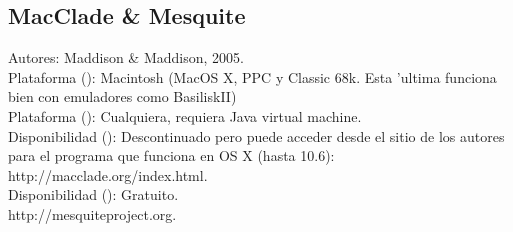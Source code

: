 \subsection{MacClade \& Mesquite}
\noindent
Autores: Maddison \& Maddison, 2005.\\
Plataforma (): Macintosh (MacOS X, PPC y Classic 68k. Esta 'ultima funciona bien con emuladores como BasiliskII)\\
Plataforma (): Cualquiera, requiera Java virtual machine.\\
Disponibilidad (): Descontinuado pero puede acceder desde el sitio de los autores para el programa que funciona en OS X (hasta 10.6):\\
http://macclade.org/index.html.
\\
Disponibilidad (): Gratuito.\\ http://mesquiteproject.org.
\\
